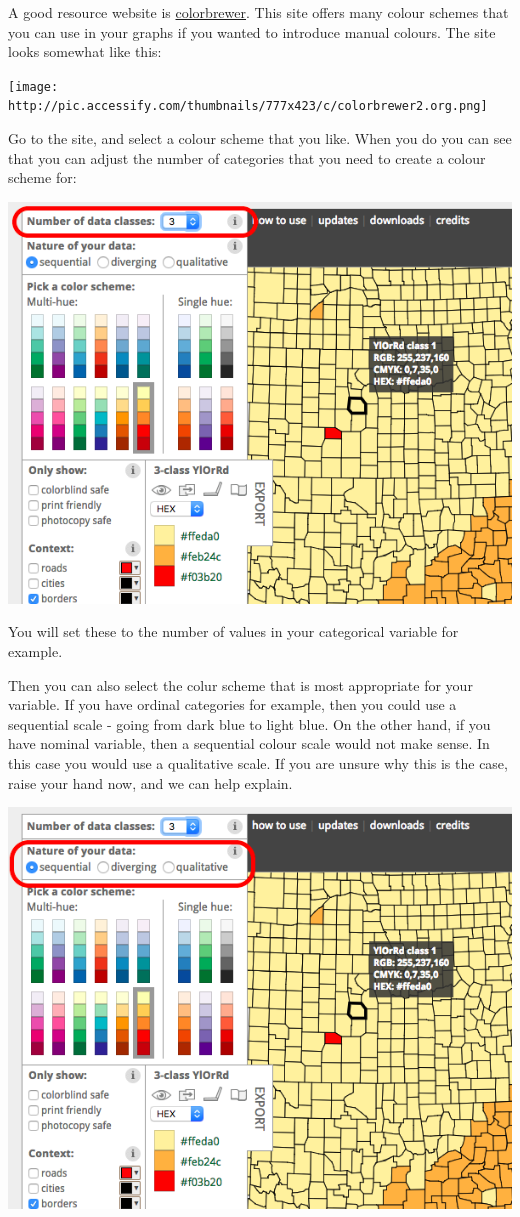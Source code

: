 \documentclass[]{book}
\theoremstyle{definition}
\theoremstyle{definition}
\theoremstyle{definition}
\theoremstyle{remark}
\begin{document}
A good resource website is \href{http://colorbrewer2.org/}{colorbrewer}.
This site offers many colour schemes that you can use in your graphs if
you wanted to introduce manual colours. The site looks somewhat like
this:

\texttt{[image: http://pic.accessify.com/thumbnails/777x423/c/colorbrewer2.org.png]}

Go to the site, and select a colour scheme that you like. When you do
you can see that you can adjust the number of categories that you need
to create a colour scheme for:

\includegraphics{imgs/choose_col_num.png}

You will set these to the number of values in your categorical variable
for example.

Then you can also select the colur scheme that is most appropriate for
your variable. If you have ordinal categories for example, then you
could use a sequential scale - going from dark blue to light blue. On
the other hand, if you have nominal variable, then a sequential colour
scale would not make sense. In this case you would use a qualitative
scale. If you are unsure why this is the case, raise your hand now, and
we can help explain.

\includegraphics{imgs/choose_col_vartyp.png}
\end{document}
